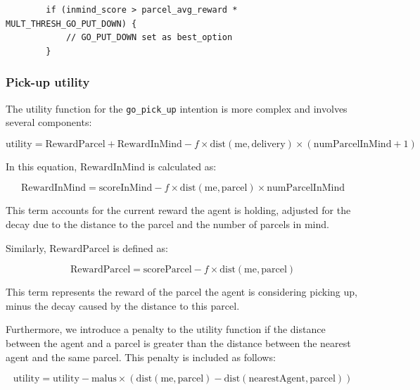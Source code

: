 \documentclass[10pt]{article}
\begin{document}
\begin{verbatim}
        if (inmind_score > parcel_avg_reward * MULT_THRESH_GO_PUT_DOWN) {
            // GO_PUT_DOWN set as best_option
        }
\end{verbatim}

\subsubsection{Pick-up utility}

The utility function for the \texttt{go\_pick\_up} intention is more complex and involves several components:

\begin{equation}
    \text{utility} = \text{RewardParcel} + \text{RewardInMind} - f \times \text{dist}(\text{me}, \text{delivery}) \times (\text{numParcelInMind} + 1)
\end{equation}

In this equation, $\text{RewardInMind}$ is calculated as:

\begin{equation}
    \text{RewardInMind} = \text{scoreInMind} - f \times \text{dist}(\text{me}, \text{parcel}) \times \text{numParcelInMind}
\end{equation}

This term accounts for the current reward the agent is holding, adjusted for the decay due to the distance to the parcel and the number of parcels in mind.

Similarly, $\text{RewardParcel}$ is defined as:

\begin{equation}
    \text{RewardParcel} = \text{scoreParcel} - f \times \text{dist}(\text{me}, \text{parcel})
\end{equation}

This term represents the reward of the parcel the agent is considering picking up, minus the decay caused by the distance to this parcel.

Furthermore, we introduce a penalty to the utility function if the distance between the agent and a parcel is greater than the distance between the nearest agent and the same parcel. This penalty is included as follows:

\begin{equation}
    \text{utility} = \text{utility} - \text{malus} \times (\text{dist}(\text{me}, \text{parcel}) - \text{dist}(\text{nearestAgent}, \text{parcel}))
\end{equation}
\end{document}
